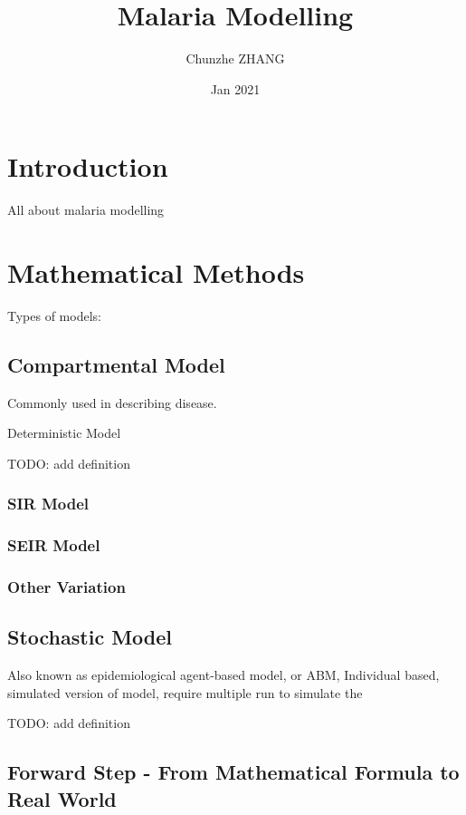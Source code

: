 \documentclass[a4paper, 12pt, twoside]{article}
\title{Malaria Modelling}
\author{Chunzhe ZHANG}
\date{Jan 2021}
\begin{document}
\begin{titlepage}
\maketitle
\end{titlepage}

\tableofcontents

\section{Introduction}
All about malaria modelling

\section{Mathematical Methods}

Types of models:

\subsection{Compartmental Model}

Commonly used in describing disease. 

Deterministic Model 

TODO: add definition

\subsubsection{SIR Model}

\subsubsection{SEIR Model}

\subsubsection{Other Variation}

\subsection{Stochastic Model}
Also known as epidemiological agent-based model, or ABM, 
Individual based, simulated version of model, require multiple run to simulate the 

TODO: add definition

\subsection{Forward Step - From Mathematical Formula to Real World}
\end{document}
